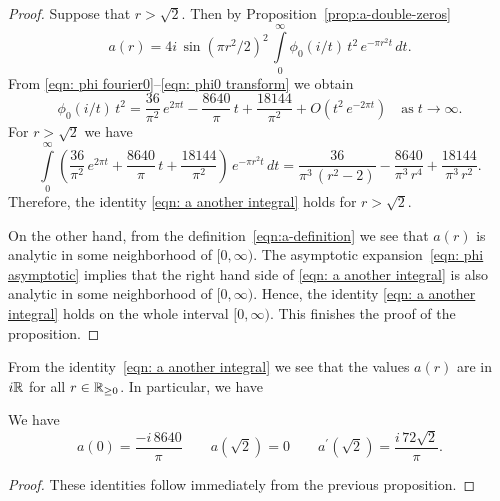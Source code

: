 \begin{proof}
Suppose that $r>\sqrt{2}$. Then by Proposition~\ref{prop:a-double-zeros}
$$a(r)=4i\,\sin(\pi r^2/2)^2\,\int\limits_{0}^{\infty}\phi_0(i/t)\,t^2\,e^{-\pi r^2 t}\,dt. $$
From \eqref{eqn: phi fourier0}--\eqref{eqn: phi0 transform} we obtain
\begin{equation}\label{eqn: phi asymptotic}
\phi_0(i/t)\,t^2=\frac{36}{\pi^2}\,e^{2 \pi t}-\frac{8640}{\pi}\,t+\frac{18144}{\pi^2}+O(t^2\,e^{-2\pi t})\quad\mbox{as}\;t\to\infty.
\end{equation}
For $r>\sqrt{2}$ we have
\begin{equation}
\int\limits_0^\infty \left(\frac{36}{\pi^2}\,e^{2 \pi t}+\frac{8640}{\pi}\,t+\frac{18144}{\pi^2}\right)\,e^{-\pi r^2 t}\,dt
=\frac{36}{\pi^3\,(r^2-2)}-\frac{8640}{\pi^3\,r^4}+\frac{18144}{\pi^3\,r^2}.\end{equation}
Therefore, the identity \eqref{eqn: a another integral} holds for $r>\sqrt{2}$.

On the other hand, from the definition~\eqref{eqn:a-definition} we see that $a(r)$ is analytic in some neighborhood of $[0,\infty)$. The asymptotic expansion~\eqref{eqn: phi asymptotic} implies that the right hand side of \eqref{eqn: a another integral} is also analytic in some neighborhood of $[0,\infty)$. Hence, the identity \eqref{eqn: a another integral} holds on the whole interval $[0,\infty)$. This finishes the proof of the proposition.
\end{proof}
From the identity~\eqref{eqn: a another integral} we see that the values $a(r)$ are in $i\mathbb{R}$ for all $r\in\mathbb{R}_{\geq0}$. In particular, we have
\begin{proposition}\label{prop: a values}
We have
\begin{equation}
a(0)=\frac{-i\,8640}{\pi}\qquad
a(\sqrt{2})=0\qquad
a^\prime(\sqrt{2})=\frac{i\,72\sqrt{2}}{\pi}.
\end{equation}
\end{proposition}
\begin{proof}
These identities follow immediately from the previous proposition.
\end{proof}

